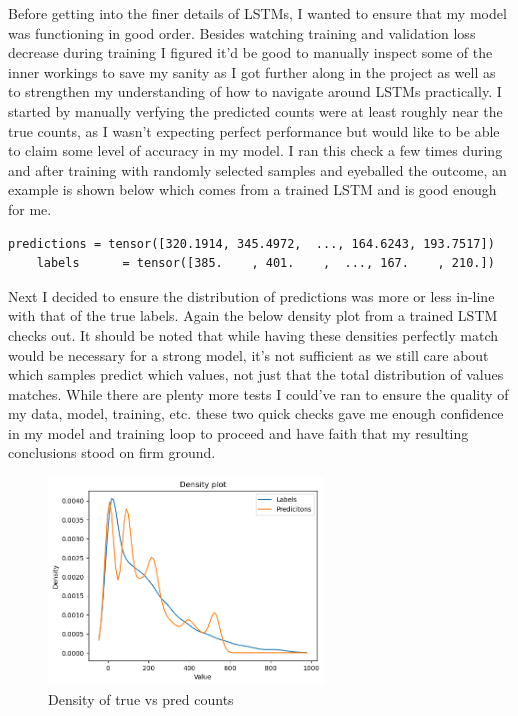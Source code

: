 \documentclass[12pt, twoside]{report}
\begin{document}
Before getting into the finer details of LSTMs, I wanted to ensure that my model was functioning in good order.
Besides watching training and validation loss decrease during training I figured it'd be good to manually inspect
some of the inner workings to save my sanity as I got further along in the project as well as to strengthen my 
understanding of how to navigate around LSTMs practically.
I started by manually verfying the predicted counts were at least roughly near the true counts, as I wasn't
expecting perfect performance but would like to be able to claim some level of accuracy in my model.
I ran this check a few times during and after training with randomly selected samples and eyeballed the outcome, an
example is shown below which comes from a trained LSTM and is good enough for me.

\begin{lstlisting}[style=Python,caption=Sample preds vs labels,label=lst:python]
    predictions = tensor([320.1914, 345.4972,  ..., 164.6243, 193.7517])
    labels      = tensor([385.    , 401.    ,  ..., 167.    , 210.])
\end{lstlisting}

Next I decided to ensure the distribution of predictions was more or less in-line with that of the true labels.
Again the below density plot from a trained LSTM checks out. It should be noted that while having these
densities perfectly match would be necessary for a strong model, it's not sufficient as we still care about 
which samples predict which values, not just that the total distribution of values matches.
While there are plenty more tests I could've ran to ensure the quality of my data, model, training, etc.
these two quick checks gave me enough confidence in my model and training loop to proceed and have faith
that my resulting conclusions stood on firm ground.

\begin{figure}[H]
    \centering
    \includegraphics[width=0.65\textwidth]{figures/density plot.png}
    \caption*{Density of true vs pred counts}
\end{figure}
\end{document}
